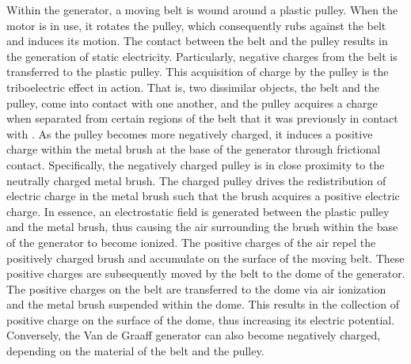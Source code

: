 \documentclass[oneside,12pt]{amsart}
\begin{document}
\indent Within the generator, a moving belt is wound around a plastic pulley. When the motor is in use, it rotates the pulley, which consequently rubs against the belt and induces its motion. The contact between the belt and the pulley results in the generation of static electricity. Particularly, negative charges from the belt is transferred to the plastic pulley.  This acquisition of charge by the pulley is the triboelectric effect in action. That is, two dissimilar objects, the belt and the pulley, come into contact with one another, and the pulley acquires a charge when separated from certain regions of the belt that it was previously in contact with \cite{Vander:2}. As the pulley becomes more negatively charged, it induces a positive charge within the metal brush at the base of the generator through frictional contact. Specifically, the negatively charged pulley is in close proximity to the neutrally charged metal brush. The charged pulley drives the redistribution of electric charge in the metal brush such that the brush acquires a positive electric charge. In essence, an electrostatic field is generated between the plastic pulley and the metal brush, thus causing the air surrounding the brush within the base of the generator to become ionized. The positive charges of the air repel the positively charged brush and accumulate on the surface of the moving belt. These positive charges are subsequently moved by the belt to the dome of the generator. The positive charges on the belt are transferred to the dome via air ionization and the metal brush suspended within the dome. This results in the collection of  positive charge on the surface of the dome, thus increasing its electric potential. Conversely, the Van de Graaff generator can also become negatively charged, depending on the material of the belt and the pulley.\\
\end{document}
